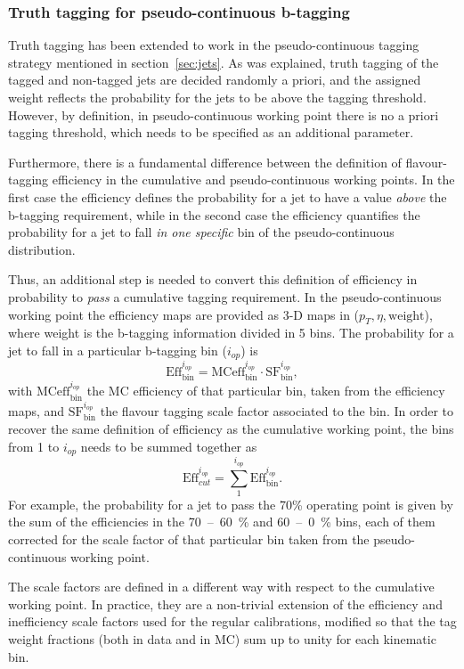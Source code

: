 \subsubsection{Truth tagging for pseudo-continuous b-tagging}
\label{app:truth-tag-pcbt}
Truth tagging has been extended to work in the pseudo-continuous tagging
strategy mentioned in section~\ref{sec:jets}. As was explained, truth tagging of
the tagged and non-tagged jets are decided randomly a priori, and the assigned
weight reflects the probability for the jets to be above the tagging threshold.
However, by definition, in pseudo-continuous working point there is no a priori
tagging threshold, which needs to be specified as an additional parameter.

Furthermore, there is a fundamental difference between the definition of
flavour-tagging efficiency in the cumulative and pseudo-continuous working
points. In the first case the efficiency defines the probability for a jet to
have a value \textit{above} the b-tagging requirement, while in the second case
the efficiency quantifies the probability for a jet to fall \textit{in one
  specific} bin of the pseudo-continuous distribution.

 Thus, an additional step is needed to convert this definition of efficiency in
 probability to \textit{pass} a cumulative tagging requirement.  In the
 pseudo-continuous working point the efficiency maps are provided as 3-D maps in
 ($p_T, \eta, \text{weight}$), where weight is the b-tagging information divided
 in 5 bins. The probability for a jet to fall in a particular b-tagging
 bin ($i_{op}$) is
 \begin{equation}
   \text{Eff}_{\text{bin}}^{i_{op}} = \text{MCeff}_{\text{bin}}^{i_{op}} \cdot \text{SF}_{\text{bin}}^{i_{op}},
 \end{equation}
 with $\text{MCeff}_{\text{bin}}^{i_{op}}$ the MC efficiency of that particular
 bin, taken from the efficiency maps, and $\text{SF}_{\text{bin}}^{i_{op}}$ the
 flavour tagging scale factor associated to the bin. In order to recover the
 same definition of efficiency as the cumulative working point, the bins from 1
 to $i_{op}$ needs to be summed together as
 \begin{equation}
   \text{Eff}_{cut}^{i_{op}} = \sum_1^{i_{op}} \text{Eff}_{\text{bin}}^{i_{op}}.
 \end{equation}
 For example, the probability for a jet to pass the 70\% operating point is
 given by the sum of the efficiencies in the 70~--~60~\% and 60~--~0~\% bins,
 each of them corrected for the scale factor of that particular bin taken from
 the pseudo-continuous working point.
 
 The scale factors are defined in a different way with respect to the cumulative
 working point. In practice, they are a non-trivial extension of the efficiency
 and inefficiency scale factors used for the regular calibrations, modified so
 that the tag weight fractions (both in data and in MC) sum up to unity for each
 kinematic bin.